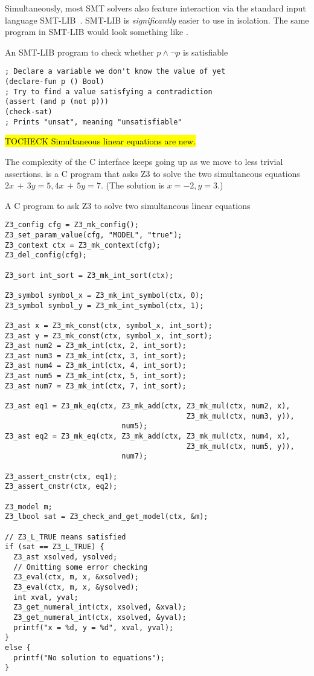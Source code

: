 Simultaneously, most SMT solvers also feature interaction via the standard
input language SMT-LIB~\cite{smtlib2:10}. SMT-LIB is \textit{significantly}
easier to use in isolation. The same program in SMT-LIB would look something
like .

\begin{program}
\caption{An SMT-LIB program to check whether $p \wedge \neg p$ is satisfiable}
\label{fig:smtlib-prop}
\begin{verbatim}
; Declare a variable we don't know the value of yet
(declare-fun p () Bool)
; Try to find a value satisfying a contradiction
(assert (and p (not p)))
(check-sat)
; Prints "unsat", meaning "unsatisfiable"
\end{verbatim}
\end{program}

\hl{TOCHECK Simultaneous linear equations are new.}

The complexity of the C interface keeps going up as we move to less trivial
assertions.  is a C program that asks Z3 to solve the
two simultaneous equations $2x\,+\,3y = 5, 4x\,+\,5y = 7$. (The solution is $x =
-2, y = 3$.)

\begin{program}
\caption{A C program to ask Z3 to solve two simultaneous linear equations}
\label{fig:c-simultaneous}
\begin{verbatim}
Z3_config cfg = Z3_mk_config();
Z3_set_param_value(cfg, "MODEL", "true");
Z3_context ctx = Z3_mk_context(cfg);
Z3_del_config(cfg);

Z3_sort int_sort = Z3_mk_int_sort(ctx);

Z3_symbol symbol_x = Z3_mk_int_symbol(ctx, 0);
Z3_symbol symbol_y = Z3_mk_int_symbol(ctx, 1);

Z3_ast x = Z3_mk_const(ctx, symbol_x, int_sort);
Z3_ast y = Z3_mk_const(ctx, symbol_x, int_sort);
Z3_ast num2 = Z3_mk_int(ctx, 2, int_sort);
Z3_ast num3 = Z3_mk_int(ctx, 3, int_sort);
Z3_ast num4 = Z3_mk_int(ctx, 4, int_sort);
Z3_ast num5 = Z3_mk_int(ctx, 5, int_sort);
Z3_ast num7 = Z3_mk_int(ctx, 7, int_sort);

Z3_ast eq1 = Z3_mk_eq(ctx, Z3_mk_add(ctx, Z3_mk_mul(ctx, num2, x),
                                          Z3_mk_mul(ctx, num3, y)),
                           num5);
Z3_ast eq2 = Z3_mk_eq(ctx, Z3_mk_add(ctx, Z3_mk_mul(ctx, num4, x),
                                          Z3_mk_mul(ctx, num5, y)),
                           num7);

Z3_assert_cnstr(ctx, eq1);
Z3_assert_cnstr(ctx, eq2);

Z3_model m;
Z3_lbool sat = Z3_check_and_get_model(ctx, &m);

// Z3_L_TRUE means satisfied
if (sat == Z3_L_TRUE) {
  Z3_ast xsolved, ysolved;
  // Omitting some error checking
  Z3_eval(ctx, m, x, &xsolved);
  Z3_eval(ctx, m, x, &ysolved);
  int xval, yval;
  Z3_get_numeral_int(ctx, xsolved, &xval);
  Z3_get_numeral_int(ctx, xsolved, &yval);
  printf("x = %d, y = %d", xval, yval);
}
else {
  printf("No solution to equations");
}
\end{verbatim}
\end{program}

